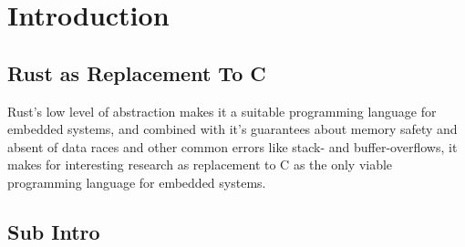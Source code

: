 
\section{Introduction}
\label{chap:intro}

\lipsum[1]


\subsection{Rust as Replacement To C} %
\label{sub:rust_as_replacement_to_c}


Rust's low level of abstraction makes it a suitable programming language for embedded systems, and
combined with it's guarantees about memory safety and absent of data races and other common errors
like stack- and buffer-overflows, it makes for interesting research as replacement to C as the only
viable programming language for embedded systems.


\subsection{Sub Intro}
\label{chap:intro_sub}

\lipsum
